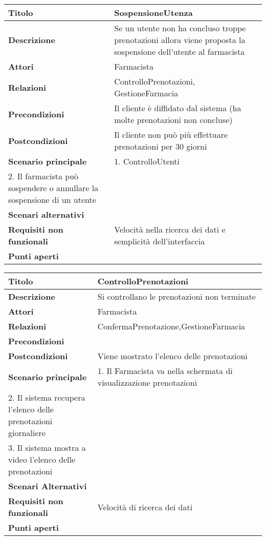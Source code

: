\begin{tabular} {|P{4.5cm}|P{12.5cm}|}
  \hline
    \textbf{Titolo} & SospensioneUtenza\\
  \hline
    \textbf{Descrizione} & Se un utente non ha concluso troppe prenotazioni allora viene proposta la sospensione dell'utente al farmacista\\
  \hline
    \textbf{Attori} & Farmacista\\
  \hline
    \textbf{Relazioni} & ControlloPrenotazioni, GestioneFarmacia\\
  \hline
    \textbf{Precondizioni} & Il cliente è diffidato dal sistema (ha molte prenotazioni non concluse)\\
  \hline
    \textbf{Postcondizioni} & Il cliente non può più effettuare prenotazioni per 30 giorni\\
  \hline
    \textbf{Scenario principale} & 1. ControlloUtenti \\ 2. Il farmacista può sospendere o annullare la sospensione di un utente \\
  \hline
    \textbf{Scenari alternativi} &\\
  \hline
    \textbf{Requisiti non funzionali} & Velocità nella ricerca dei dati e semplicità dell'interfaccia\\
  \hline
    \textbf{Punti aperti} &\\
  \hline
\end{tabular}
\hfill
\break

\begin{tabular} {|P{4.5cm}|P{12.5cm}|}
\hline
  \textbf{Titolo} & ControlloPrenotazioni\\
\hline
  \textbf{Descrizione} & Si controllano le prenotazioni non terminate\\
\hline
  \textbf{Attori} & Farmacista\\
\hline
  \textbf{Relazioni} & ConfermaPrenotazione,GestioneFarmacia\\
\hline
  \textbf{Precondizioni} &\\
\hline
  \textbf{Postcondizioni} & Viene mostrato l'elenco delle prenotazioni\\
\hline
  \textbf{Scenario principale} & 1. Il Farmacista va nella schermata di visualizzazione prenotazioni \\ 2. Il sistema recupera l'elenco delle prenotazioni giornaliere \\ 3. Il sistema mostra a video l'elenco delle prenotazioni\\
\hline
  \textbf{Scenari Alternativi} &\\
\hline
  \textbf{Requisiti non funzionali} & Velocità di ricerca dei dati\\
\hline
  \textbf{Punti aperti} &\\
\hline
\end{tabular}
\hfill
\break

